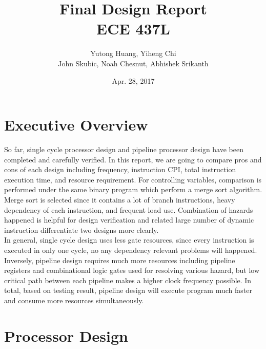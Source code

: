 \documentclass[12pt]{article}
\title{Final Design Report \\
	ECE 437L}
\author{Yutong Huang, Yiheng Chi \\
        John Skubic, Noah Chesnut, Abhishek Srikanth}
\date{Apr. 28, 2017}
\begin{document}
  \maketitle

  \newpage
  \section{Executive Overview}

  So far, single cycle processor design and pipeline processor design have been completed and carefully verified. In this report, we are going to compare pros and cons of each design including frequency, instruction CPI, total instruction execution time, and resource requirement. For controlling variables, comparison is performed under the same binary program which perform a merge sort algorithm. Merge sort is selected since it contains a lot of branch instructions, heavy dependency of each instruction, and frequent load use. Combination of hazards happened is helpful for design verification and related large number of dynamic instruction differentiate two designs more clearly. \\
  In general, single cycle design uses less gate resources, since every instruction is executed in only one cycle, no any dependency relevant problems will happened. Inversely, pipeline design requires much more resources including pipeline registers and combinational logic gates used for resolving various hazard, but low critical path between each pipeline makes a higher clock frequency possible. In total, based on testing result, pipeline design will execute program much faster and consume more resources simultaneously.

  \newpage
  \section{Processor Design}
\end{document}
